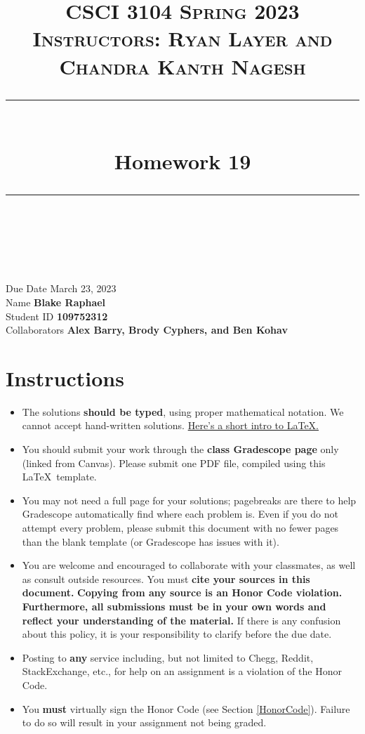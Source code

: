 \documentclass[11pt]{article}
\title{
\normalfont \normalsize 
\textsc{CSCI 3104 Spring 2023 \\ 
Instructors: Ryan Layer and Chandra Kanth Nagesh} \\
[10pt] 
\rule{\linewidth}{0.5pt} \\[6pt] 
\huge Homework 19 \\
\rule{\linewidth}{2pt}  \\[10pt]
}
\author{}
\date{}
\theoremstyle{definition}
\theoremstyle{definition}
\theoremstyle{definition}
\begin{document}

\maketitle


\noindent
Due Date \dotfill March 23, 2023 \\
Name \dotfill \textbf{Blake Raphael} \\
Student ID \dotfill \textbf{109752312} \\
Collaborators \dotfill \textbf{Alex Barry, Brody Cyphers, and Ben Kohav}

\tableofcontents

\section{Instructions}
 \begin{itemize}
	\item The solutions \textbf{should be typed}, using proper mathematical notation. We cannot accept hand-written solutions. \href{http://ece.uprm.edu/~caceros/latex/introduction.pdf}{Here's a short intro to \LaTeX.}
	\item You should submit your work through the \textbf{class Gradescope page} only (linked from Canvas). Please submit one PDF file, compiled using this \LaTeX \ template.
	\item You may not need a full page for your solutions; pagebreaks are there to help Gradescope automatically find where each problem is. Even if you do not attempt every problem, please submit this document with no fewer pages than the blank template (or Gradescope has issues with it).

	\item You are welcome and encouraged to collaborate with your classmates, as well as consult outside resources. You must \textbf{cite your sources in this document.} \textbf{Copying from any source is an Honor Code violation. Furthermore, all submissions must be in your own words and reflect your understanding of the material.} If there is any confusion about this policy, it is your responsibility to clarify before the due date. 

	\item Posting to \textbf{any} service including, but not limited to Chegg, Reddit, StackExchange, etc., for help on an assignment is a violation of the Honor Code.

	\item You \textbf{must} virtually sign the Honor Code (see Section \ref{HonorCode}). Failure to do so will result in your assignment not being graded.
\end{itemize}
\end{document}
